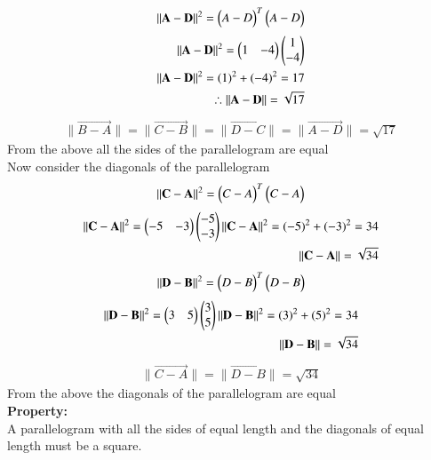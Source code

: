 \documentclass[journal,12pt,onecolumn]{IEEEtran}
\begin{document}
        \begin{align}
            \|\mathbf{A-D}\|^2=\begin{pmatrix}A-D\end{pmatrix}^T\begin{pmatrix}A-D\end{pmatrix}
        \end{align}
        \begin{align}
            \|\mathbf{A-D}\|^2=\begin{pmatrix}1 & -4\end{pmatrix}\begin{pmatrix}1\\-4\end{pmatrix}\\
            \|\mathbf{A-D}\|^2={(1)^2+(-4)^2}=17\\
            \therefore \|\mathbf{A-D}\|=\sqrt{17}\\
        \end{align}
        \begin{align}
            \|\vec{B-A}\|=\|\vec{C-B}\|=\|\vec{D-C}\|=\|\vec{A-D}\|=\sqrt{17}
        \end{align}
        From the above all the sides of the parallelogram are equal\\
        Now consider the diagonals of the parallelogram\\
        \begin{align}
            \|\mathbf{C-A}\|^2=\begin{pmatrix}C-A\end{pmatrix}^T\begin{pmatrix}C-A\end{pmatrix}\\
        \end{align}
        \begin{align}
            \|\mathbf{C-A}\|^2=\begin{pmatrix}-5 & -3\end{pmatrix}\begin{pmatrix}-5\\-3\end{pmatrix}
            \|\mathbf{C-A}\|^2=(-5)^2+(-3)^2=34\\
            \|\mathbf{C-A}\|=\sqrt{34}\\
        \end{align}
        \begin{align}
            \|\mathbf{D-B}\|^2=\begin{pmatrix}D-B\end{pmatrix}^T\begin{pmatrix}D-B\end{pmatrix}\\
            \end{align}
            \begin{align}
            \|\mathbf{D-B}\|^2=\begin{pmatrix}3 & 5\end{pmatrix}\begin{pmatrix}3\\5\end{pmatrix}
            \|\mathbf{D-B}\|^2=(3)^2+(5)^2=34\\
            \|\mathbf{D-B}\|=\sqrt{34}\\
        \end{align}
        \begin{align}
            \|\vec{C-A}\|=\|\vec{D-B}\|=\sqrt{34} 
        \end{align}
        From the above the diagonals of the parallelogram are equal\\
        \textbf{Property:}\\
        A parallelogram with all the sides of equal length and the diagonals of equal length must be a square.\\
\end{document}
